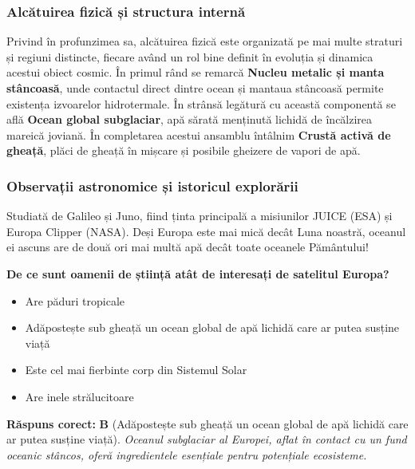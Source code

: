 \subsubsection*{Alcătuirea fizică și structura internă}
Privind în profunzimea sa, alcătuirea fizică este organizată pe mai multe straturi și regiuni distincte, fiecare având un rol bine definit în evoluția și dinamica acestui obiect cosmic. În primul rând se remarcă \textbf{Nucleu metalic și manta stâncoasă}, unde contactul direct dintre ocean și mantaua stâncoasă permite existența izvoarelor hidrotermale. În strânsă legătură cu această componentă se află \textbf{Ocean global subglaciar}, apă sărată menținută lichidă de încălzirea mareică joviană. În completarea acestui ansamblu întâlnim \textbf{Crustă activă de gheață}, plăci de gheață în mișcare și posibile gheizere de vapori de apă.

\subsubsection*{Observații astronomice și istoricul explorării}
Studiată de Galileo și Juno, fiind ținta principală a misiunilor JUICE (ESA) și Europa Clipper (NASA). Deși Europa este mai mică decât Luna noastră, oceanul ei ascuns are de două ori mai multă apă decât toate oceanele Pământului!

\vspace{6pt}
\begin{tcolorbox}[orbitarquiz, title={\textbf{Întrebare de verificare \#11: Europa}}]
\textbf{De ce sunt oamenii de știință atât de interesați de satelitul Europa?}
\begin{itemize}[leftmargin=2.2em, itemsep=2pt, topsep=4pt]
  \item[$\square$ \textbf{A.}] Are păduri tropicale
  \item[$\square$ \textbf{B.}] Adăpostește sub gheață un ocean global de apă lichidă care ar putea susține viață
  \item[$\square$ \textbf{C.}] Este cel mai fierbinte corp din Sistemul Solar
  \item[$\square$ \textbf{D.}] Are inele strălucitoare
\end{itemize}
\vspace{2pt}
{\footnotesize\color{orbitarMuted}\textbf{Răspuns corect:} \textbf{B} (Adăpostește sub gheață un ocean global de apă lichidă care ar putea susține viață). \emph{Oceanul subglaciar al Europei, aflat în contact cu un fund oceanic stâncos, oferă ingredientele esențiale pentru potențiale ecosisteme.}}
\end{tcolorbox}
\clearpage


